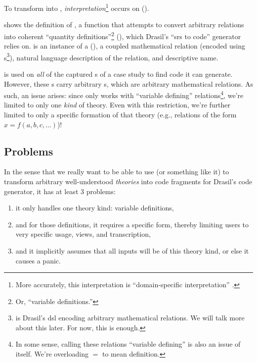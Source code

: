 To transform  into
, \textit{interpretation}\footnote{More
    accurately, this interpretation is ``domain-specific interpretation''
    \cite{Czarnecki2005}.} occurs on 
().

\originalRelToQDHaskell{}

 shows the definition of \relToQD{}, a function that
attempts to convert arbitrary relations into coherent ``quantity
definitions''\footnote{Or, ``variable definitions.''} (\QDefinition{}), which
Drasil's ``\acs{srs} to code'' generator relies on.  is an
instance of a \RelationConcept{} (), a coupled
mathematical relation (encoded using \Relation{}s\footnote{\Relation{} is
    Drasil's \acs{dsl} encoding arbitrary mathematical relations. We will talk more
    about this later. For now, this is enough.}), natural language description of
the relation, and descriptive name.

\originalRelationConcept{}

\relToQD{} is used on \textit{all} of the captured \InstanceModel{}s of a case
study to find code it can generate. However, these \InstanceModel{}s carry
arbitrary \Relation{}s, which are arbitrary mathematical relations. As such, an
issue arises: since \relToQD{} only works with ``variable defining''
relations\footnote{In some sense, calling these relations ``variable defining''
    is also an issue of itself. We're overloading \(=\) to mean definition.}, we're
limited to only one \textit{kind} of theory. Even with this restriction, we're
further limited to only a specific formation of that theory (e.g., relations of
the form \(x = f(a, b, c, \ldots{})\))!

\subsection{Problems}
\label{chap:modelkinds:sec:transforming-theories-to-code:subsec:problems}

In the sense that we really want to be able to use \relToQD{} (or something like
it) to transform arbitrary well-understood \textit{theories} into code fragments
for Drasil's code generator, it has at least 3 problems:
\begin{enumerate}
    \item[\namedlabel{mk:issue:1}{P1}] it only handles one theory kind:
        variable definitions,
    \item[\namedlabel{mk:issue:2}{P2}] and for those definitions, it requires a
        specific form, thereby limiting users to very specific usage, views, and
        transcription,
    \item[\namedlabel{mk:issue:3}{P3}] and it implicitly assumes that all inputs
        will be of this theory kind, or else it causes a panic.
\end{enumerate}

